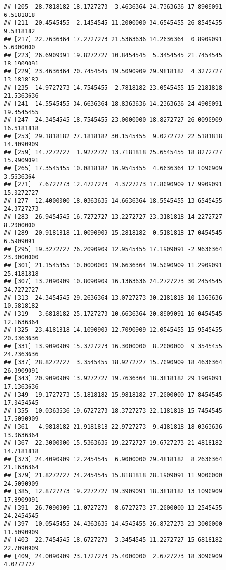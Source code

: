 \documentclass[]{book}
\begin{document}
\begin{verbatim}
## [205] 28.7818182 18.1727273 -3.4636364 24.7363636 17.8909091  6.5181818
## [211] 20.4545455  2.1454545 11.2000000 34.6545455 26.8545455  9.5818182
## [217] 22.7636364 17.2727273 21.5363636 14.2636364  0.8909091  5.6000000
## [223] 26.6909091 19.8272727 10.8454545  5.3454545 21.7454545 18.1909091
## [229] 23.4636364 20.7454545 19.5090909 29.9818182  4.3272727 13.1818182
## [235] 14.9727273 14.7545455  2.7818182 23.0545455 15.2181818 21.5363636
## [241] 14.5545455 34.6636364 18.8363636 14.2363636 24.4909091 19.3545455
## [247] 24.3454545 18.7545455 23.0000000 18.8272727 26.0090909 16.6181818
## [253] 29.1818182 27.1818182 30.1545455  9.0272727 22.5181818 14.4090909
## [259] 14.7272727  1.9272727 13.7181818 25.6545455 18.8272727 15.9909091
## [265] 17.3545455 10.0818182 16.9545455  4.6636364 12.1090909  3.5636364
## [271]  7.6727273 12.4727273  4.3727273 17.8090909 17.9909091 15.0272727
## [277] 12.4000000 18.0363636 14.6636364 18.5545455 13.6545455 24.3727273
## [283] 26.9454545 16.7272727 13.2272727 23.3181818 14.2272727  8.2000000
## [289] 20.9181818 11.0090909 15.2818182  0.5181818 17.0454545  6.5909091
## [295] 19.3272727 26.2090909 12.9545455 17.1909091 -2.9636364 23.0000000
## [301] 21.1545455 10.0000000 19.6636364 19.5090909 11.2909091 25.4181818
## [307] 13.2090909 10.8090909 16.1363636 24.2727273 30.2454545 34.7272727
## [313] 24.3454545 29.2636364 13.0727273 30.2181818 10.1363636 10.6818182
## [319]  3.6818182 25.1727273 10.6636364 20.8909091 16.0454545 12.1636364
## [325] 23.4181818 14.1090909 12.7090909 12.0545455 15.9545455 20.0363636
## [331] 13.9090909 15.3727273 16.3000000  8.2000000  9.3545455 24.2363636
## [337] 28.8272727  3.3545455 18.9272727 15.7090909 18.4636364 26.3909091
## [343] 20.9090909 13.9272727 19.7636364 18.3818182 29.1909091 17.1363636
## [349] 19.1727273 15.1818182 15.9818182 27.2000000 17.8454545 17.0454545
## [355] 10.0363636 19.6727273 18.3727273 22.1181818 15.7454545 17.6090909
## [361]  4.9818182 21.9181818 22.9727273  9.4181818 18.0363636 13.0636364
## [367] 22.3000000 15.5363636 19.2272727 19.6727273 21.4818182 14.7181818
## [373] 24.4090909 12.2454545  6.9000000 29.4818182  8.2636364 21.1636364
## [379] 21.8272727 24.2454545 15.8181818 28.1909091 11.9000000 24.5090909
## [385] 12.8727273 19.2272727 19.3909091 18.3818182 13.1090909 17.8909091
## [391] 26.7090909 11.0727273  8.6727273 27.2000000 13.2545455 24.2454545
## [397] 10.0545455 24.4363636 14.4545455 26.8727273 23.3000000 11.6090909
## [403] 22.7454545 18.6727273  3.3454545 11.2272727 15.6818182 22.7090909
## [409] 24.0090909 23.1727273 25.4000000  2.6727273 18.3090909  4.0272727

\end{verbatim}
\end{document}
